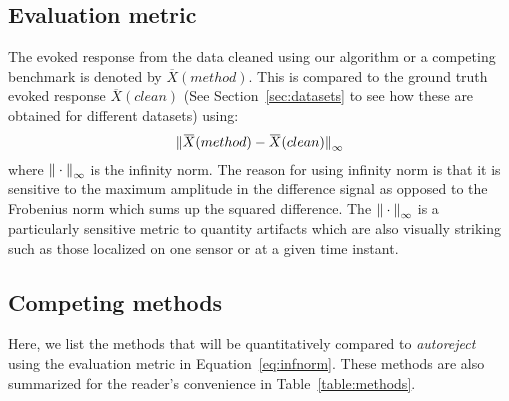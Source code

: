 \subsection{Evaluation metric}
The evoked response from the data cleaned using our algorithm or a competing benchmark is denoted by $\overbar{X}(method)$. This is compared to the ground truth evoked response $\overbar{X}(clean)$ (See Section~\ref{sec:datasets} to see how these are obtained for different datasets) using:
%
\begin{equation}
\infnorm{\overbar{X}(method) - \overbar{X}(clean)}
\label{eq:infnorm}
\end{equation}
%
where ${\| \cdot \|}_{\mathrm{\infty}}$ is the infinity norm. The reason for using infinity norm is that it is sensitive to the maximum amplitude in the difference signal as opposed to the Frobenius norm which sums up the squared difference. The ${\| \cdot \|}_{\mathrm{\infty}}$ is a particularly sensitive metric to quantity artifacts which are also visually striking such as those localized on one sensor or at a given time instant.

\subsection{Competing methods}
\label{sec:competing_methods}

Here, we list the methods that will be quantitatively compared to \emph{autoreject} using the evaluation metric in Equation~\ref{eq:infnorm}. These methods are also summarized for the reader's convenience in Table~\ref{table:methods}.

